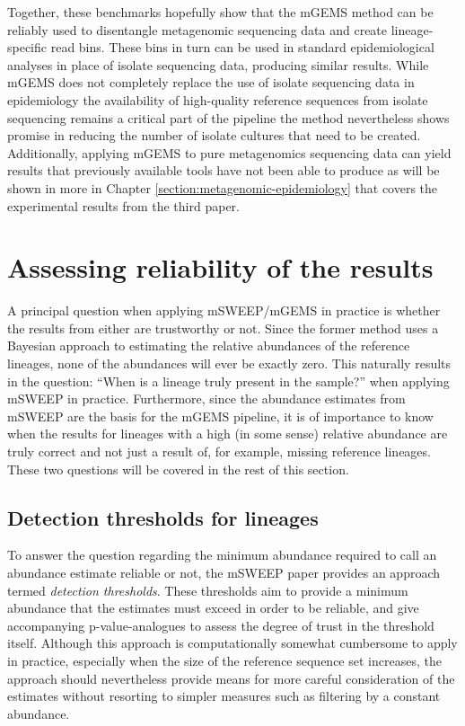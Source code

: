 \documentclass[officiallayout]{tktla}
\begin{document}
Together, these benchmarks hopefully show that the mGEMS method can be
reliably used to disentangle metagenomic sequencing data and create
lineage-specific read bins. These bins in turn can be used in standard
epidemiological analyses in place of isolate sequencing data,
producing similar results. While mGEMS does not completely replace the
use of isolate sequencing data in epidemiology \textemdash the
availability of high-quality reference sequences from isolate
sequencing remains a critical part of the pipeline \textemdash the
method nevertheless shows promise in reducing the number of isolate
cultures that need to be created. Additionally, applying mGEMS to pure
metagenomics sequencing data can yield results that previously
available tools have not been able to produce as will be shown in more
in Chapter \ref{section:metagenomic-epidemiology} that covers the
experimental results from the third paper.

\section{Assessing reliability of the results}

A principal question when applying mSWEEP/mGEMS in practice is whether
the results from either are trustworthy or not. Since the former
method uses a Bayesian approach to estimating the relative abundances
of the reference lineages, none of the abundances will ever be exactly
zero. This naturally results in the question: ``When is a lineage
truly present in the sample?'' when applying mSWEEP in
practice. Furthermore, since the abundance estimates from mSWEEP are
the basis for the mGEMS pipeline, it is of importance to know when the
results for lineages with a high (in some sense) relative abundance
are truly correct and not just a result of, for example, missing
reference lineages. These two questions will be covered in the rest of
this section.

\subsection{Detection thresholds for lineages}
To answer the question regarding the minimum abundance required to
call an abundance estimate reliable or not, the mSWEEP paper provides
an approach termed \textit{detection thresholds}. These thresholds aim
to provide a minimum abundance that the estimates must exceed in order
to be reliable, and give accompanying p-value-analogues to assess the
degree of trust in the threshold itself. Although this approach is
computationally somewhat cumbersome to apply in practice, especially
when the size of the reference sequence set increases, the approach
should nevertheless provide means for more careful consideration of
the estimates without resorting to simpler measures such as filtering
by a constant abundance.
\end{document}
